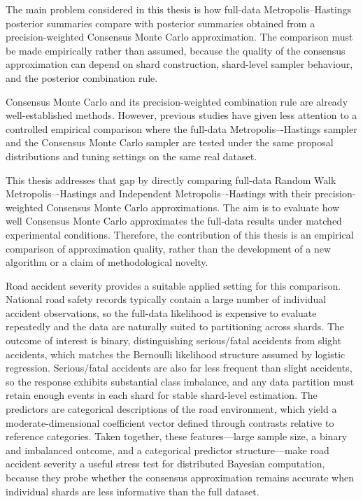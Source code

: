 The main problem considered in this thesis is how full-data Metropolis--Hastings posterior summaries compare with posterior summaries obtained from a precision-weighted Consensus Monte Carlo approximation. The comparison must be made empirically rather than assumed, because the quality of the consensus approximation can depend on shard construction, shard-level sampler behaviour, and the posterior combination rule.

Consensus Monte Carlo and its precision-weighted combination rule are already well-established methods. However, previous studies have given less attention to a controlled empirical comparison where the full-data Metropolis–-Hastings sampler and the Consensus Monte Carlo sampler are tested under the same proposal distributions and tuning settings on the same real dataset.

This thesis addresses that gap by directly comparing full-data Random Walk Metropolis–-Hastings and Independent Metropolis–-Hastings with their precision-weighted Consensus Monte Carlo approximations. The aim is to evaluate how well Consensus Monte Carlo approximates the full-data results under matched experimental conditions. Therefore, the contribution of this thesis is an empirical comparison of approximation quality, rather than the development of a new algorithm or a claim of methodological novelty.

Road accident severity provides a suitable applied setting for this comparison. National road safety records typically contain a large number of individual accident observations, so the full-data likelihood is expensive to evaluate repeatedly and the data are naturally suited to partitioning across shards. The outcome of interest is binary, distinguishing serious/fatal accidents from slight accidents, which matches the Bernoulli likelihood structure assumed by logistic regression. Serious/fatal accidents are also far less frequent than slight accidents, so the response exhibits substantial class imbalance, and any data partition must retain enough events in each shard for stable shard-level estimation. The predictors are categorical descriptions of the road environment, which yield a moderate-dimensional coefficient vector defined through contrasts relative to reference categories. Taken together, these features---large sample size, a binary and imbalanced outcome, and a categorical predictor structure---make road accident severity a useful stress test for distributed Bayesian computation, because they probe whether the consensus approximation remains accurate when individual shards are less informative than the full dataset.

